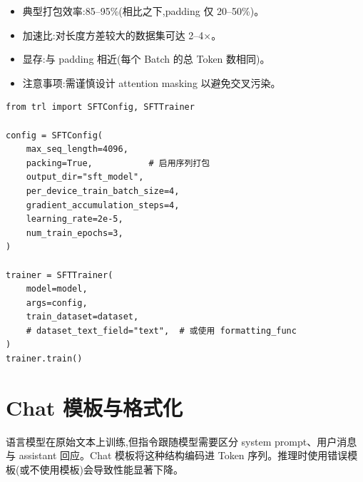 \begin{keybox}[打包效率]
\begin{itemize}
  \item 典型打包效率:85--95\%(相比之下,padding 仅 20--50\%)。
  \item 加速比:对长度方差较大的数据集可达 2--4$\times$。
  \item 显存:与 padding 相近(每个 Batch 的总 Token 数相同)。
  \item 注意事项:需谨慎设计 attention masking 以避免交叉污染。
\end{itemize}
\end{keybox}

\begin{examplebox}
\begin{lstlisting}[style=pythonstyle]
from trl import SFTConfig, SFTTrainer

config = SFTConfig(
    max_seq_length=4096,
    packing=True,           # 启用序列打包
    output_dir="sft_model",
    per_device_train_batch_size=4,
    gradient_accumulation_steps=4,
    learning_rate=2e-5,
    num_train_epochs=3,
)

trainer = SFTTrainer(
    model=model,
    args=config,
    train_dataset=dataset,
    # dataset_text_field="text",  # 或使用 formatting_func
)
trainer.train()
\end{lstlisting}
\end{examplebox}

\section{Chat 模板与格式化}
\label{sec:chat-templates}

\begin{intuitionbox}[为何 Chat 模板重要]
语言模型在原始文本上训练,但指令跟随模型需要区分 system prompt、用户消息与 assistant 回应。Chat 模板将这种结构编码进 Token 序列。推理时使用错误模板(或不使用模板)会导致性能显著下降。
\end{intuitionbox}

